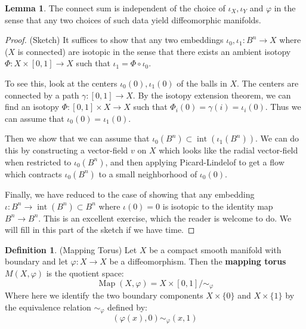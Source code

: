 \documentclass[12pt]{article}
\theoremstyle{definition}
\newtheorem{definition}[theorem]{Definition}
\numberwithin{equation}{section}
\newtheorem{lemma}[theorem]{Lemma}
\newcommand{\op}{\operatorname}
\begin{document}
\begin{lemma} The connect sum is independent of the choice of $\iota_X,\iota_Y$ and $\varphi$ in the sense that any two choices of such data yield diffeomorphic manifolds.
\end{lemma}

\begin{proof} (Sketch) It suffices to show that any two embeddings $\iota_0,\iota_1:B^n \to X$ where ($X$ is connected) are isotopic in the sense that there exists an ambient isotopy $\Phi:X \times [0,1] \to X$ such that $\iota_1 = \Phi \circ \iota_0$. 

 To see this, look at the centers $\iota_0(0), \iota_1(0)$ of the balls in $X$. The centers are connected by a path $\gamma:[0,1] \to X$. By the isotopy extension theorem, we can find an isotopy $\Phi:[0,1] \times X \to X$ such that $\Phi_i(0) = \gamma(i) = \iota_i(0)$. Thus we can assume that $\iota_0(0) = \iota_1(0)$. 

 Then we show that we can assume that $\iota_0(B^n) \subset \op{int}(\iota_1(B^n))$. We can do this by constructing a vector-field $v$ on $X$ which looks like the radial vector-field when restricted to $\iota_0(B^n)$, and then applying Picard-Lindelof to get a flow which contracts $\iota_0(B^n)$ to a small neighborhood of $\iota_0(0)$. 

 Finally, we have reduced to the case of showing that any embedding $\iota:B^n \to \op{int}(B^n) \subset B^n$ where $\iota(0) = 0$ is isotopic to the identity map $B^n \to B^n$. This is an excellent exercise, which the reader is welcome to do. We will fill in this part of the sketch if we have time. 
\end{proof}

\begin{definition} (Mapping Torus) Let $X$ be a compact smooth manifold with boundary and let $\varphi:X \to X$ be a diffeomorphism. Then the {\bf mapping torus} $M(X,\varphi)$ is the quotient space:
\[
\op{Map}(X,\varphi) = X \times [0,1]/\sim_\varphi
\]
Where here we identify the two boundary components $X \times \{0\}$ and $X \times \{1\}$ by the equivalence relation $\sim_\varphi$ defined by:
\[
(\varphi(x),0) \sim_\varphi (x,1)
\]
\end{definition}
\end{document}
